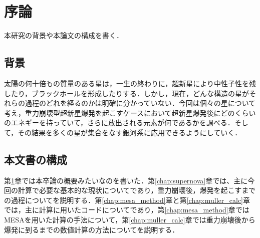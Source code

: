 \chapter{序論}
\label{chap:introduction}

本研究の背景や本論文の構成を書く．


\section{背景}

太陽の何十倍もの質量のある星は，一生の終わりに，超新星により中性子性を残したり，ブラックホールを形成したりする．しかし，現在，どんな構造の星がそれらの過程のどれを経るのかは明確に分かっていない．今回は個々の星について考え，重力崩壊型超新星爆発を起こすケースにおいて超新星爆発後にどのくらいのエネギーを持っていて，さらに放出される元素が何であるかを調べる．そして，その結果を多くの星が集合をなす銀河系に応用できるようにしていく．


\section{本文書の構成}

第\ref{chap:introduction}章では本卒論の概要みたいなのを書いた．第\ref{chap:supernova}章では、主に今回の計算で必要な基本的な現状についてであり，重力崩壊後，爆発を起こすまでの過程についてを説明する．第\ref{chap:mesa_method}章と第\ref{chap:muller_calc}章では，主に計算に用いたコードについてであり，第\ref{chap:mesa_method}章ではMESAを用いた計算の手法について，第\ref{chap:muller_calc}章では重力崩壊後から爆発に到るまでの数値計算の方法についてを説明する．
